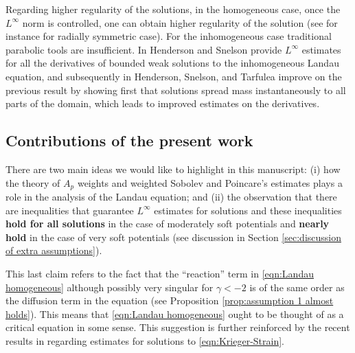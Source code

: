 \documentclass[12pt,american]{amsart}
\numberwithin{equation}{section}
\theoremstyle{plain}
\theoremstyle{definition}                  %
\begin{document}
Regarding higher regularity of the solutions, in the homogeneous case, once the $L^\infty$ norm is controlled, one can obtain higher regularity of the solution (see for instance \cite[Section 4]{GuGu15} for radially symmetric case). For the inhomogeneous case traditional parabolic tools are insufficient. In \cite{HendersonSnelson2017} Henderson and Snelson provide $L^\infty$ estimates for all the derivatives of bounded weak solutions to the inhomogeneous Landau equation, and subsequently in \cite{HendersonSnelsonTarfulea2017} Henderson, Snelson, and Tarfulea improve on the previous result by showing first that solutions spread mass instantaneously to all parts of the domain, which leads to improved estimates on the derivatives.

\subsection{Contributions of the present work}\label{section: contributions} There are two main ideas we would like to highlight in this manuscript: (i) how the theory of $A_p$ weights and weighted Sobolev and Poincare's estimates plays a role in the analysis of the Landau equation; and (ii) the observation that there are inequalities that guarantee $L^\infty$ estimates for solutions and these inequalities \textbf{hold for all solutions} in the case of moderately soft potentials and \textbf{nearly hold} in the case of very soft potentials (see discussion in Section \ref{sec:discussion of extra assumptions}). 

This last claim refers to the fact that the ``reaction'' term in \eqref{eqn:Landau homogeneous} although possibly very singular for $\gamma<-2$ is of the same order as the diffusion term in the equation (see Proposition \ref{prop:assumption 1 almost holds}). This means that \eqref{eqn:Landau homogeneous} ought to be thought of as a critical equation in some sense. This suggestion is further reinforced by the recent results in \cite{GuGu15} regarding estimates for solutions to \eqref{eqn:Krieger-Strain}. 
\end{document}
